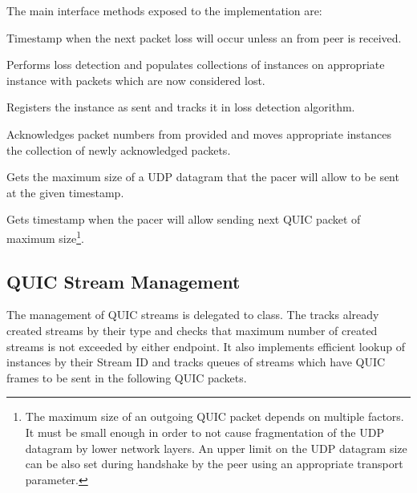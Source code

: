 The main interface methods exposed to the \ManagedQuicConnection{} implementation are:

\begin{description}

        Timestamp when the next packet loss will occur unless an \ACK{} from peer is received.

        Performs loss detection and populates collections of \SentPacket{} instances on appropriate \PacketNumberSpace{} instance with packets which are now considered lost.

        Registers the \SentPacket{} instance as sent and tracks it in loss detection algorithm.

        Acknowledges packet numbers from provided \RangeSet{} and moves appropriate \SentPacket{} instances the collection of newly acknowledged packets.

        Gets the maximum size of a UDP datagram that the pacer will allow to be sent at the given timestamp.

        Gets timestamp when the pacer will allow sending next QUIC packet of maximum size\footnote{The maximum size of an outgoing QUIC packet depends on multiple factors. It must be small enough in order to not cause fragmentation of the UDP datagram by lower network layers. An upper limit on the UDP datagram size can be also set during handshake by the peer using an appropriate transport parameter.}.

\end{description}

\subsection{QUIC Stream Management}

The management of QUIC streams is delegated to \StreamCollection{} class. The \StreamCollection{}
tracks already created streams by their type and checks that maximum number of created streams is
not exceeded by either endpoint. It also implements efficient lookup of \ManagedQuicStream{}
instances by their Stream ID and tracks queues of streams which have QUIC frames to be sent in the
following QUIC packets.

